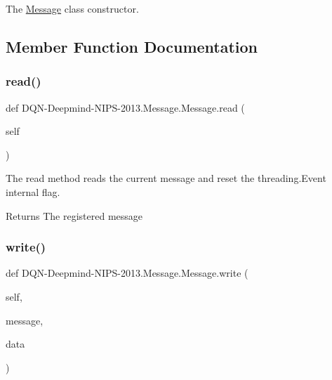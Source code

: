 The \hyperlink{classDQN-Deepmind-NIPS-2013_1_1Message_1_1Message}{Message} class constructor. 



\subsection{Member Function Documentation}
\hypertarget{classDQN-Deepmind-NIPS-2013_1_1Message_1_1Message_a7f12ede11926bee5d5b3946375f28156}{}\label{classDQN-Deepmind-NIPS-2013_1_1Message_1_1Message_a7f12ede11926bee5d5b3946375f28156} 
\subsubsection{\texorpdfstring{read()}{read()}}
{\footnotesize\ttfamily def D\+QN-\/Deepmind-\/N\+I\+PS-\/2013.Message.\+Message.\+read (\begin{DoxyParamCaption}\item[{}]{self }\end{DoxyParamCaption})}



The read method reads the current message and reset the threading.\+Event internal flag. 

\begin{DoxyReturn}{Returns}
The registered message 
\end{DoxyReturn}
\hypertarget{classDQN-Deepmind-NIPS-2013_1_1Message_1_1Message_a53cf5ac601122f2ace3178abee8f81db}{}\label{classDQN-Deepmind-NIPS-2013_1_1Message_1_1Message_a53cf5ac601122f2ace3178abee8f81db} 
\subsubsection{\texorpdfstring{write()}{write()}}
{\footnotesize\ttfamily def D\+QN-\/Deepmind-\/N\+I\+PS-\/2013.Message.\+Message.\+write (\begin{DoxyParamCaption}\item[{}]{self,  }\item[{}]{message,  }\item[{}]{data }\end{DoxyParamCaption})}



